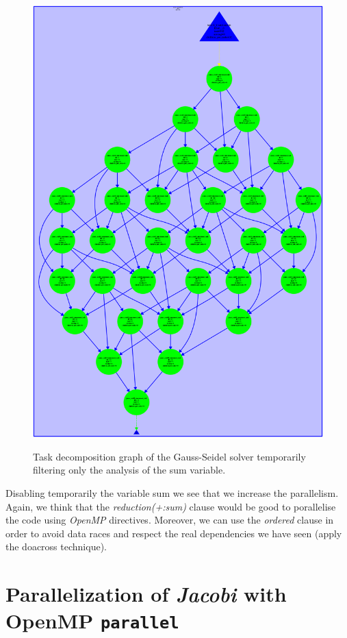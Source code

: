\documentclass[12pt, a4paper]{article}
\begin{document}
\begin{figure}[H]
	\centering
	\includegraphics[scale=0.20]{./images/tareador-gauss-seidel-2b-sum}
	\label{fig:TDGGauss-Seidel-disable-sum}
	\caption{Task decomposition graph of the Gauss-Seidel solver temporarily filtering only the analysis of the sum variable.}
\end{figure}

Disabling temporarily the variable sum we see that we increase the parallelism. Again, we think that the \textit{reduction(+:sum)} clause would be good to porallelise the code using \textit{OpenMP} directives. Moreover, we can use the \textit{ordered} clause in order to avoid data races and respect the real dependencies we have seen (apply the doacross technique).


\section{Parallelization of \textit{Jacobi} with OpenMP \texttt{parallel}}
\end{document}
